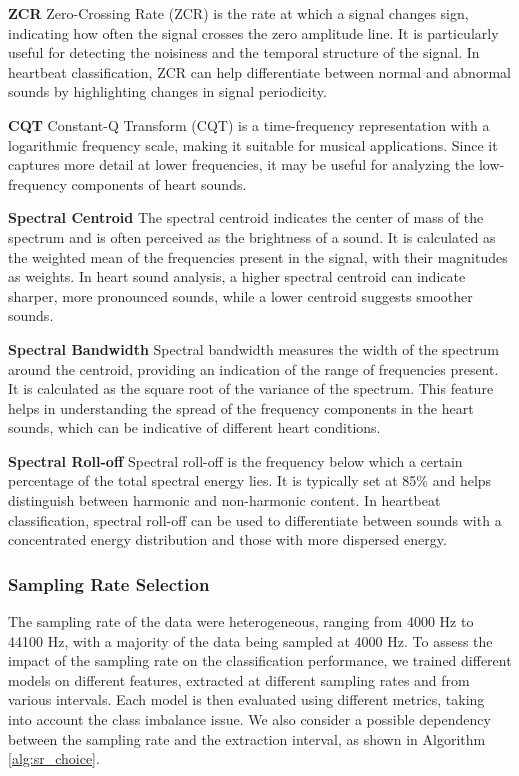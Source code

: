 \vspace{0.3cm}\noindent
\textbf{ZCR}\newline
Zero-Crossing Rate (ZCR) is the rate at which a signal changes sign, indicating how often the signal 
crosses the zero amplitude line. It is particularly useful for detecting the noisiness and the temporal 
structure of the signal. In heartbeat classification, ZCR can help differentiate between normal and abnormal 
sounds by highlighting changes in signal periodicity.

\vspace{0.3cm}\noindent
\textbf{CQT}\newline
Constant-Q Transform (CQT) is a time-frequency representation with a logarithmic frequency scale, making it 
suitable for musical applications. Since it captures more detail at lower frequencies, it may be useful for analyzing 
the low-frequency components of heart sounds.

\vspace{0.3cm}\noindent
\textbf{Spectral Centroid}\newline
The spectral centroid indicates the center of mass of the spectrum and is often perceived as the brightness of a 
sound. It is calculated as the weighted mean of the frequencies present in the signal, with their magnitudes as 
weights. In heart sound analysis, a higher spectral centroid can indicate sharper, more pronounced sounds, 
while a lower centroid suggests smoother sounds. 

\vspace{0.3cm}\noindent
\textbf{Spectral Bandwidth}\newline
Spectral bandwidth measures the width of the spectrum around the centroid, providing an indication of the range 
of frequencies present. It is calculated as the square root of the variance of the spectrum. This feature helps 
in understanding the spread of the frequency components in the heart sounds, which can be indicative of different 
heart conditions.

\vspace{0.3cm}\noindent
\textbf{Spectral Roll-off}
Spectral roll-off is the frequency below which a certain percentage of the total spectral energy lies. It is 
typically set at 85\% and helps distinguish between harmonic and non-harmonic content. In heartbeat classification, 
spectral roll-off can be used to differentiate between sounds with a concentrated energy distribution and those with more dispersed energy.
\subsubsection{Sampling Rate Selection} %
\label{sec:sampling_rate}
The sampling rate of the data were heterogeneous, ranging from 4000 Hz to 44100 Hz, with a majority of the data being sampled at 4000 Hz.
To assess the impact of the sampling rate on the classification performance, we trained different models on
different features, extracted at different sampling rates and from various intervals. Each model is then 
evaluated using different metrics, taking into account the class imbalance issue.
We also consider a possible dependency between the sampling rate and the extraction interval, as shown 
in Algorithm \ref{alg:sr_choice}.

